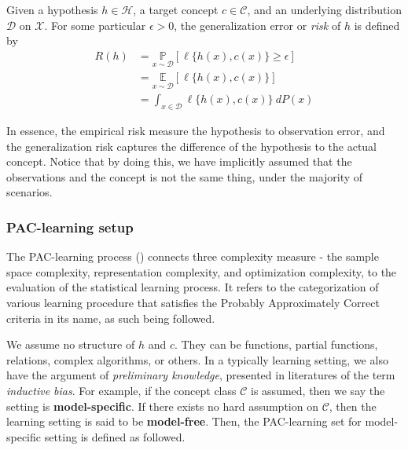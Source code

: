 \documentclass[
  journal=largetwo,
  year=2025,
  volume=37,
]{cup-journal}
\begin{document}
\begin{definition}
    Given a hypothesis $h\in\mathcal{H}$, a target concept $c\in\mathcal{C}$, and an underlying distribution $\mathcal{D}$ on $\mathcal{X}$. For some particular $\epsilon>0$, the generalization error or \textit{risk} of $h$ is defined by
    \begin{equation}
        \begin{split}
          R(h) 
          &= \underset{x\sim\mathcal{D}}{\mathbb{P}} [\ell\{h(x),c(x)\}\geq \epsilon]\\
          &= \underset{x\sim\mathcal{D}}{\mathbb{E}}[\ell\{h(x),c(x)\}]\\ 
          &= \int_{x\in \mathcal{D}} \ell\{h(x),c(x)\} \: dP(x)
        \end{split}
    \end{equation}
\end{definition}

In essence, the empirical risk measure the hypothesis to observation error, and the generalization risk captures the difference of the hypothesis to the actual concept. Notice that by doing this, we have implicitly assumed that the observations and the concept is not the same thing, under the majority of scenarios.

\subsubsection{PAC-learning setup}

The PAC-learning process (\cite{10.5555/2621980,10.5555/2371238,STL_Hajek_Maxim_2021}) connects three complexity measure - the sample space complexity, representation complexity, and optimization complexity, to the evaluation of the statistical learning process. It refers to the categorization of various learning procedure that satisfies the Probably Approximately Correct criteria in its name, as such being followed. 

We assume no structure of $h$ and $c$. They can be functions, partial functions, relations, complex algorithms, or others. In a typically learning setting, we also have the argument of \textit{preliminary knowledge}, presented in literatures of the term \textit{inductive bias}. For example, if the concept class $\mathcal{C}$ is assumed, then we say the setting is \textbf{model-specific}. If there exists no hard assumption on $\mathcal{C}$, then the learning setting is said to be \textbf{model-free}. Then, the PAC-learning set for model-specific setting is defined as followed. 
\end{document}
